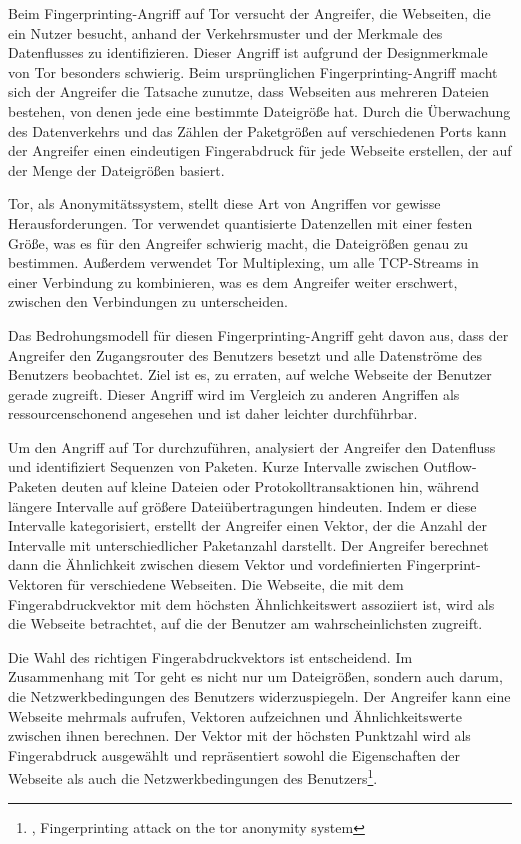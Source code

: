 Beim Fingerprinting-Angriff auf Tor versucht der Angreifer, die Webseiten, die ein Nutzer besucht, anhand der Verkehrsmuster und der Merkmale des Datenflusses zu identifizieren. Dieser Angriff ist aufgrund der Designmerkmale von Tor besonders schwierig. Beim ursprünglichen Fingerprinting-Angriff macht sich der Angreifer die Tatsache zunutze, dass Webseiten aus mehreren Dateien bestehen, von denen jede eine bestimmte Dateigröße hat. Durch die Überwachung des Datenverkehrs und das Zählen der Paketgrößen auf verschiedenen Ports kann der Angreifer einen eindeutigen Fingerabdruck für jede Webseite erstellen, der auf der Menge der Dateigrößen basiert.

Tor, als Anonymitätssystem, stellt diese Art von Angriffen vor gewisse Herausforderungen. Tor verwendet quantisierte Datenzellen mit einer festen Größe, was es für den Angreifer schwierig macht, die Dateigrößen genau zu bestimmen. Außerdem verwendet Tor Multiplexing, um alle TCP-Streams in einer Verbindung zu kombinieren, was es dem Angreifer weiter erschwert, zwischen den Verbindungen zu unterscheiden.

Das Bedrohungsmodell für diesen Fingerprinting-Angriff geht davon aus, dass der Angreifer den Zugangsrouter des Benutzers besetzt und alle Datenströme des Benutzers beobachtet. Ziel ist es, zu erraten, auf welche Webseite der Benutzer gerade zugreift. Dieser Angriff wird im Vergleich zu anderen Angriffen als ressourcenschonend angesehen und ist daher leichter durchführbar.

Um den Angriff auf Tor durchzuführen, analysiert der Angreifer den Datenfluss und identifiziert Sequenzen von Paketen. Kurze Intervalle zwischen Outflow-Paketen deuten auf kleine Dateien oder Protokolltransaktionen hin, während längere Intervalle auf größere Dateiübertragungen hindeuten. Indem er diese Intervalle kategorisiert, erstellt der Angreifer einen Vektor, der die Anzahl der Intervalle mit unterschiedlicher Paketanzahl darstellt. Der Angreifer berechnet dann die Ähnlichkeit zwischen diesem Vektor und vordefinierten Fingerprint-Vektoren für verschiedene Webseiten. Die Webseite, die mit dem Fingerabdruckvektor mit dem höchsten Ähnlichkeitswert assoziiert ist, wird als die Webseite betrachtet, auf die der Benutzer am wahrscheinlichsten zugreift.

Die Wahl des richtigen Fingerabdruckvektors ist entscheidend. Im Zusammenhang mit Tor geht es nicht nur um Dateigrößen, sondern auch darum, die Netzwerkbedingungen des Benutzers widerzuspiegeln. Der Angreifer kann eine Webseite mehrmals aufrufen, Vektoren aufzeichnen und Ähnlichkeitswerte zwischen ihnen berechnen. Der Vektor mit der höchsten Punktzahl wird als Fingerabdruck ausgewählt und repräsentiert sowohl die Eigenschaften der Webseite als auch die Netzwerkbedingungen des Benutzers\footnote{\cite{FingerprintingOnTorAttack}, Fingerprinting attack on the tor anonymity system}.